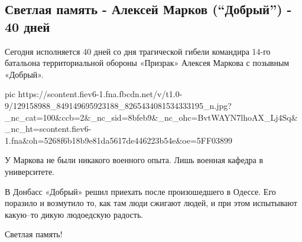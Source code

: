  
 
 
 
 

\subsection{Светлая память - Алексей Марков (\enquote{Добрый}) - 40 дней}


Сегодня исполняется 40 дней со дня трагической гибели командира 14-го батальона
территориальной обороны «Призрак» Алексея Маркова с позывным «Добрый».

\ifcmt
pic https://scontent.fiev6-1.fna.fbcdn.net/v/t1.0-9/129158988_849149695923188_8265434081534333195_n.jpg?_nc_cat=100&ccb=2&_nc_sid=8bfeb9&_nc_ohc=BvtWAYN7lhoAX_Lj4Sq&_nc_ht=scontent.fiev6-1.fna&oh=5268f6b18b9e81da5617de446223b54e&oe=5FF03899
\fi

У Маркова не были никакого военного опыта. Лишь военная кафедра в университете.

В Донбасс «Добрый» решил приехать после произошедшего в Одессе. Его поразило и
возмутило то, как там люди сжигают людей, и при этом испытывают какую–то дикую
людоедскую радость.

Светлая память!
